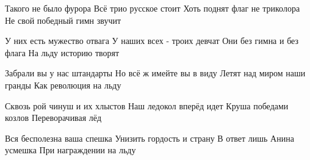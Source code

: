  
 
 
 
 
Такого не было фурора
Всё трио русское стоит
Хоть поднят флаг не триколора
Не свой победный гимн звучит

У них есть мужество отвага
У наших всех - троих девчат
Они без гимна и без флага
На льду историю творят

Забрали вы у нас штандарты
Но всё ж имейте вы в виду
Летят над миром наши гранды
Как революция на льду

Сквозь рой чинуш и их хлыстов
Наш ледокол вперёд идет
Круша победами козлов
Переворачивая лёд

Вся бесполезна ваша спешка
Унизить гордость и страну
В ответ лишь Анина усмешка
При награждении на льду

